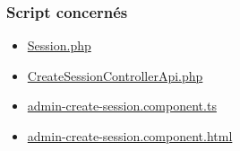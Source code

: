 \subsubsection{Script concernés}
	\begin{itemize}
		\item \href{https://github.com/victorsmits/Aquabike/blob/master/backend/src/Entity/Session.php}{Session.php}
		\item \href{https://github.com/victorsmits/Aquabike/blob/master/backend/src/Controller/API/CreateSessionControllerApi.php}{CreateSessionControllerApi.php}
		\item \href{https://github.com/victorsmits/Aquabike/blob/master/frontend/src/app/admin-create-session/admin-create-session.component.ts}{admin-create-session.component.ts}
		\item \href{https://github.com/victorsmits/Aquabike/blob/master/frontend/src/app/admin-create-session/admin-create-session.component.html}{admin-create-session.component.html}
	\end{itemize}